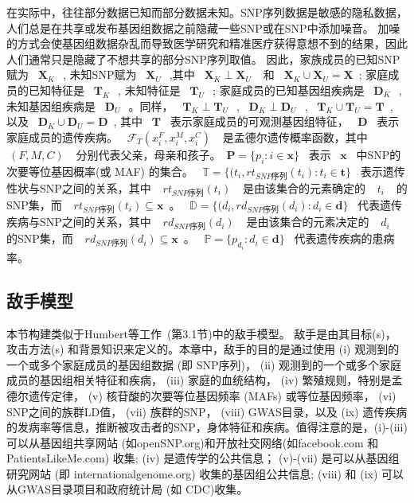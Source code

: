 在实际中，往往部分数据已知而部分数据未知。SNP序列数据是敏感的隐私数据，人们总是在共享或发布基因组数据之前隐藏一些SNP或在SNP中添加噪音。 加噪的方式会使基因组数据杂乱而导致医学研究和精准医疗获得意想不到的结果，因此人们通常只是隐藏了不想共享的部分SNP序列取值。 因此，家族成员的已知SNP赋为 ~$\mathbf{X}_K~$~, 未知SNP赋为 ~$\mathbf{X}_U~$~,其中 ~$\mathbf{X}_K \perp\mathbf{X}_U~$~ 和 ~$\mathbf{X}_K \cup \mathbf{X}_U = \mathbf{X}$~; 家庭成员的已知特征是 ~$\mathbf{T}_K~$~, 未知特征是 ~$\mathbf{T}_U~$~; 家庭成员的已知基因组疾病是 ~$\mathbf{D}_K~$~, 未知基因组疾病是 ~$\mathbf{D}_U~$~。同样， ~$\mathbf{T}_K \perp \mathbf{T}_U~$~, ~$\mathbf{D}_K \perp \mathbf{D}_U~$~, ~$\mathbf{T}_K \cup \mathbf{T}_U = \mathbf{T}$~, 以及 ~$\mathbf{D}_K \cup \mathbf{D}_U = \mathbf{D}$~, 其中 ~$\mathbf{T}$~ 表示家庭成员的可观测基因组特征， ~$\mathbf{D}$~ 表示家庭成员的遗传疾病。 ~$\mathcal{F}_T(x_i^F,x_i^M,x_i^C)~$~ 是孟德尔遗传概率函数，其中 ~$~(F,M,C)~$~ 分别代表父亲，母亲和孩子。~$\mathbf{P}=\{p_i: i \in \mathbf{x}\}$~ 表示 ~$\mathbf{x}$~ 中SNP的次要等位基因概率(或 MAF) 的集合。 ~$\mathbb{T}=\{(t_i,rt_{SNP序列}(t_i): t_i \in \mathbf{t}\}$~ 表示遗传性状与SNP之间的关系，其中 ~$~rt_{SNP序列}(t_i)~$~ 是由该集合的元素确定的 ~$~t_i~$~ 的SNP集，而 ~$~rt_{SNP序列}(t_i) \subseteq \mathbf{x}$~。 ~$\mathbb{D}=\{(d_i,rd_{SNP序列}(d_i): d_i \in \mathbf{d}\}$~ 代表遗传疾病与SNP之间的关系，其中 ~$~rd_{SNP序列}(d_i)~$~ 是由该集合的元素决定的 ~$~d_i~$~ 的SNP集，而 ~$~rd_{SNP序列}(d_i) \subseteq \mathbf{x}$~。 ~$\mathbb{P}=\{p_{d_i}: d_i \in \mathbf{d}\}$~ 代表遗传疾病的患病率。

\subsection{敌手模型}

本节构建类似于Humbert等工作~\cite{humbert2013addressing}(第3.1节)中的敌手模型。 敌手是由其目标(s)， 攻击方法(s) 和背景知识来定义的。本章中，敌手的目的是通过使用 (i) 观测到的一个或多个家庭成员的基因组数据 (即 SNP序列)，  (ii) 观测到的一个或多个家庭成员的基因组相关特征和疾病， (iii) 家庭的血统结构， (iv) 繁殖规则，特别是孟德尔遗传定律， (v) 核苷酸的次要等位基因频率 (MAFs) 或等位基因频率， (vi) SNP之间的族群LD值， (vii) 族群的SNP， (viii) GWAS目录，以及 (ix) 遗传疾病的发病率等信息，推断被攻击者的SNP，身体特征和疾病。值得注意的是，(i)-(iii) 可以从基因组共享网站 (如openSNP.org)和开放社交网络(如facebook.com 和 PatientsLikeMe.com) 收集; (iv) 是遗传学的公共信息； (v)-(vii) 是可以从基因组研究网站 (即 internationalgenome.org) 收集的基因组公共信息; (viii) 和 (ix) 可以从GWAS目录项目和政府统计局 (如 CDC)收集。

